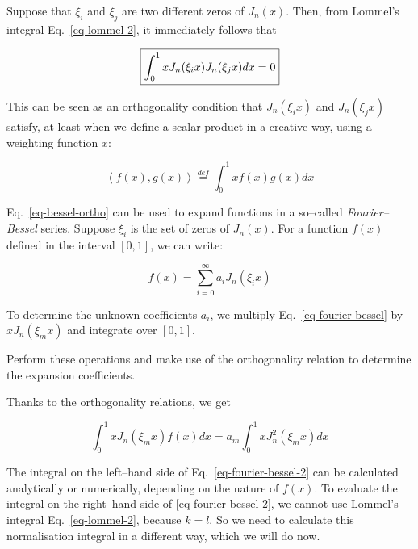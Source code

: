 Suppose that $\xi_i$ and $\xi_j$ are two different zeros of $J_n(x)$. Then, from Lommel's integral Eq.~\ref{eq-lommel-2}, it immediately follows that

\begin{equation}
\fbox{$\displaystyle
\int_0^1 x J_n(\xi_i x)J_n(\xi_j x)dx = 0 \label{eq-bessel-ortho}
$}
\end{equation} 

This can be seen as an orthogonality condition that $J_n(\xi_i x)$ and $J_n(\xi_j x)$ satisfy, at least when we define a scalar product in a creative way, using a weighting function $x$:

\begin{equation}
\left<f(x),g(x)\right> \stackrel{def}{=} \int_0^1 x f(x) g(x) dx
\end{equation} 

\noindent{} Eq.~\ref{eq-bessel-ortho} can be used to expand functions in a so--called \emph{Fourier--Bessel} series. Suppose $\xi_i$ is the set of zeros of $J_n(x)$. For a function $f(x)$ defined in the interval $[0,1]$, we can write:

\begin{equation}
f(x) = \sum_{i=0}^{\infty} a_i J_n(\xi_i x) \label{eq-fourier-bessel}
\end{equation} 

To determine the unknown coefficients $a_i$, we multiply Eq.~\ref{eq-fourier-bessel} by $x J_n(\xi_m x)$ and integrate over $[0,1]$.

\begin{cue}
Perform these operations and make use of the orthogonality relation to determine the expansion coefficients.  
\end{cue}

Thanks to the orthogonality relations, we get

\begin{equation}
\int_0^1 x J_n(\xi_m x) f(x) dx = a_m \int_0^1 x J_n^2(\xi_m x) dx \label{eq-fourier-bessel-2}
\end{equation} 

The integral on the left--hand side of Eq.~\ref{eq-fourier-bessel-2} can be calculated analytically or numerically, depending on the nature of $f(x)$. To evaluate the integral on the right--hand side of \ref{eq-fourier-bessel-2}, we cannot use Lommel's integral Eq.~\ref{eq-lommel-2}, because $k=l$. So we need to calculate this normalisation integral in a different way, which we will do now.

